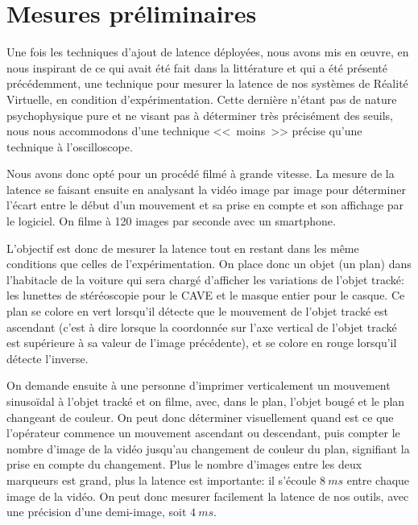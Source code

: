 	
	\section{Mesures préliminaires}
	\label{sec:mesures_prelim_latence}
	\par Une fois les techniques d'ajout de latence déployées, nous avons mis en œuvre, en nous inspirant de ce qui avait été fait dans la littérature et qui a été présenté précédemment, une technique pour mesurer la latence de nos systèmes de Réalité Virtuelle, en condition d'expérimentation. Cette dernière n'étant pas de nature psychophysique pure et ne visant pas à déterminer très précisément des seuils, nous nous accommodons d'une technique <<~moins~>> précise qu'une technique à l'oscilloscope.
	
	\par Nous avons donc opté pour un procédé filmé à grande vitesse. La mesure de la latence se faisant ensuite en analysant la vidéo image par image pour déterminer l'écart entre le début d'un mouvement et sa prise en compte et son affichage par le logiciel. On filme à 120 images par seconde avec un smartphone.
	
	\par L'objectif est donc de mesurer la latence tout en restant dans les même conditions que celles de l'expérimentation. On place donc un objet (un plan) dans l'habitacle de la voiture qui sera chargé d'afficher les variations de l'objet tracké: les lunettes de stéréoscopie pour le CAVE et le masque entier pour le casque. Ce plan se colore en vert lorsqu'il détecte que le mouvement de l'objet tracké est ascendant (c'est à dire lorsque la coordonnée sur l'axe vertical de l'objet tracké est supérieure à sa valeur de l'image précédente), et se colore en rouge lorsqu'il détecte l'inverse.
	
	\par On demande ensuite à une personne d'imprimer verticalement un mouvement sinusoïdal à l'objet tracké et on filme, avec, dans le plan, l'objet bougé et le plan changeant de couleur. On peut donc déterminer visuellement quand est ce que l'opérateur commence un mouvement ascendant ou descendant, puis compter le nombre d'image de la vidéo jusqu'au changement de couleur du plan, signifiant la prise en compte du changement. Plus le nombre d'images entre les deux marqueurs est grand, plus la latence est importante: il s'écoule $8~ms$ entre chaque image de la vidéo. On peut donc mesurer facilement la latence de nos outils, avec une précision d'une demi-image, soit $4~ms$.
	

